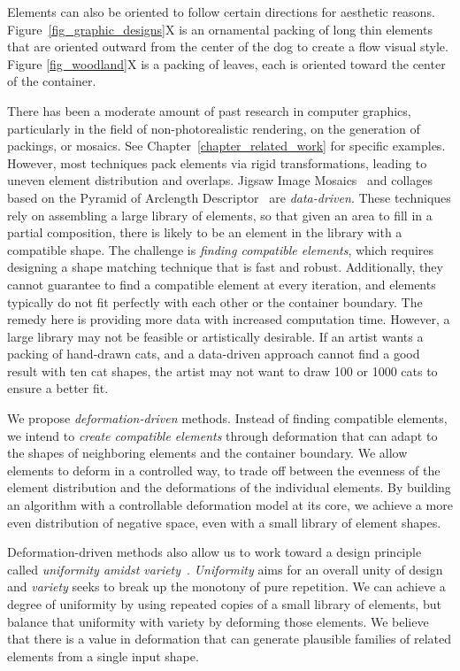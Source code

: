 Elements can also be oriented to follow certain directions for aesthetic reasons.
Figure~\ref{fig_graphic_designs}X is an ornamental packing
of long thin elements that are oriented outward from the center of the dog to create a flow visual style.
Figure \ref{fig_woodland}X is a packing of leaves, each is oriented toward the center of the container.

There has been a moderate amount of past research in computer
graphics, particularly in the field of non-photorealistic rendering,
on the generation of packings, or mosaics.  
See Chapter~\ref{chapter_related_work} for specific examples.  
However,  most techniques pack elements via rigid transformations, leading to
uneven element distribution and overlaps.  
Jigsaw Image Mosaics~\cite{Kim2002} and collages based on the Pyramid of Arclength
Descriptor~\cite{Kwan2016} are \textit{data-driven}.
These techniques rely on assembling a large library of elements, so that given an
area to fill in a partial composition, there is likely to be an
element in the library with a compatible shape.  The challenge is 
\textit{finding compatible elements},
which requires designing a shape matching technique that is fast and robust.
Additionally, they cannot guarantee to find a compatible element
at every iteration, and elements typically do not fit perfectly with each other 
or the container boundary.
The remedy here is providing more data with increased computation time.
However, a large library may not be feasible or artistically desirable.
If an artist wants a packing of hand-drawn cats, and a data-driven approach 
cannot find a good result with ten cat shapes, 
the artist may not want to draw 100 or 1000 cats to ensure a better fit.

We propose \textit{deformation-driven} methods.
Instead of finding compatible elements,
we intend to \textit{create compatible elements} through deformation
that can adapt to the shapes of neighboring elements and the container boundary.
We allow elements to deform in a controlled way,
to trade off between the evenness of the element distribution and 
the deformations of the individual elements.
By building an algorithm with a controllable deformation model at its core, we achieve a
more even distribution of negative space, even with a small library of element shapes.

Deformation-driven methods also allow us to work toward a design principle called \textit{uniformity amidst variety}~\cite{Hutcheson1729, Gombrich}. 
\textit{Uniformity} aims for an overall unity of design and 
\textit{variety} seeks to break up the monotony of pure repetition.
We can achieve a degree of uniformity by using repeated copies of a small library of elements, but balance that uniformity with
variety by deforming those elements. 
We believe that there is a value in deformation that can generate plausible families of related elements from a single input shape.

